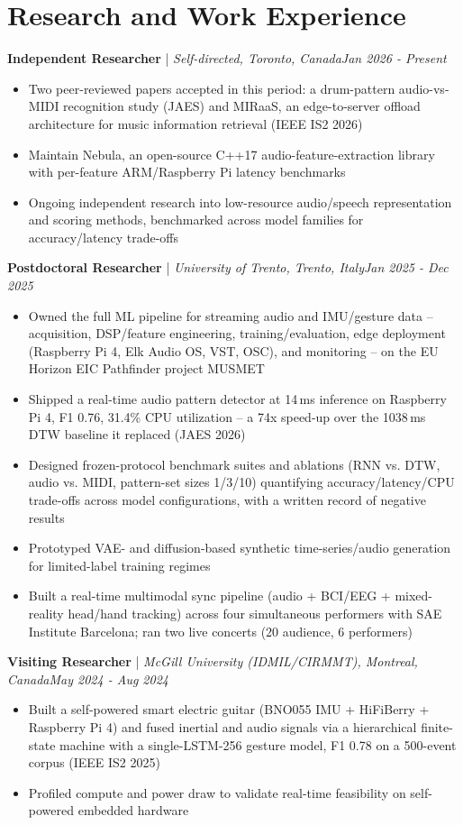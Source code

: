 \documentclass[11pt]{article}
\newenvironment{cvrole}[5]{%
  \par\noindent\textbf{\large #1} | \textit{\small #2, #3}\hfill \textit{\small #4 - #5}\par
  \begin{itemize}[leftmargin=2em, itemsep=-0.3em, topsep=-0.5em]%
}{%
  \end{itemize}\par\noindent\mbox{}\par\vspace{0.1em}%
}
\begin{document}
\section*{Research and Work Experience}

\begin{cvrole}{Independent Researcher}{Self-directed}{Toronto, Canada}{Jan 2026}{Present}
    \item Two peer-reviewed papers accepted in this period: a drum-pattern audio-vs-MIDI recognition study (JAES) and MIRaaS, an edge-to-server offload architecture for music information retrieval (IEEE IS2 2026)
    \item Maintain Nebula, an open-source C++17 audio-feature-extraction library with per-feature ARM/Raspberry Pi latency benchmarks
    \item Ongoing independent research into low-resource audio/speech representation and scoring methods, benchmarked across model families for accuracy/latency trade-offs
\end{cvrole}

\begin{cvrole}{Postdoctoral Researcher}{University of Trento}{Trento, Italy}{Jan 2025}{Dec 2025}
    \item Owned the full ML pipeline for streaming audio and IMU/gesture data -- acquisition, DSP/feature engineering, training/evaluation, edge deployment (Raspberry Pi 4, Elk Audio OS, VST, OSC), and monitoring -- on the EU Horizon EIC Pathfinder project MUSMET
    \item Shipped a real-time audio pattern detector at 14\,ms inference on Raspberry Pi 4, F1 0.76, 31.4\% CPU utilization -- a 74x speed-up over the 1038\,ms DTW baseline it replaced (JAES 2026)
    \item Designed frozen-protocol benchmark suites and ablations (RNN vs. DTW, audio vs. MIDI, pattern-set sizes 1/3/10) quantifying accuracy/latency/CPU trade-offs across model configurations, with a written record of negative results
    \item Prototyped VAE- and diffusion-based synthetic time-series/audio generation for limited-label training regimes
    \item Built a real-time multimodal sync pipeline (audio + BCI/EEG + mixed-reality head/hand tracking) across four simultaneous performers with SAE Institute Barcelona; ran two live concerts (20 audience, 6 performers)
\end{cvrole}

\begin{cvrole}{Visiting Researcher}{McGill University (IDMIL/CIRMMT)}{Montreal, Canada}{May 2024}{Aug 2024}
    \item Built a self-powered smart electric guitar (BNO055 IMU + HiFiBerry + Raspberry Pi 4) and fused inertial and audio signals via a hierarchical finite-state machine with a single-LSTM-256 gesture model, F1 0.78 on a 500-event corpus (IEEE IS2 2025)
    \item Profiled compute and power draw to validate real-time feasibility on self-powered embedded hardware
\end{cvrole}
\end{document}
